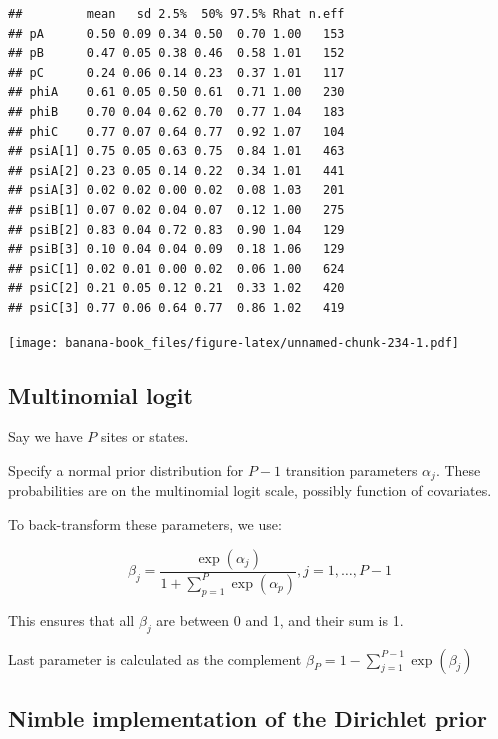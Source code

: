 \documentclass[
  12pt,
]{krantz}
\begin{document}
\begin{verbatim}
##         mean   sd 2.5%  50% 97.5% Rhat n.eff
## pA      0.50 0.09 0.34 0.50  0.70 1.00   153
## pB      0.47 0.05 0.38 0.46  0.58 1.01   152
## pC      0.24 0.06 0.14 0.23  0.37 1.01   117
## phiA    0.61 0.05 0.50 0.61  0.71 1.00   230
## phiB    0.70 0.04 0.62 0.70  0.77 1.04   183
## phiC    0.77 0.07 0.64 0.77  0.92 1.07   104
## psiA[1] 0.75 0.05 0.63 0.75  0.84 1.01   463
## psiA[2] 0.23 0.05 0.14 0.22  0.34 1.01   441
## psiA[3] 0.02 0.02 0.00 0.02  0.08 1.03   201
## psiB[1] 0.07 0.02 0.04 0.07  0.12 1.00   275
## psiB[2] 0.83 0.04 0.72 0.83  0.90 1.04   129
## psiB[3] 0.10 0.04 0.04 0.09  0.18 1.06   129
## psiC[1] 0.02 0.01 0.00 0.02  0.06 1.00   624
## psiC[2] 0.21 0.05 0.12 0.21  0.33 1.02   420
## psiC[3] 0.77 0.06 0.64 0.77  0.86 1.02   419
\end{verbatim}

\texttt{[image: banana-book\_files/figure-latex/unnamed-chunk-234-1.pdf]}

\hypertarget{multinomial-logit}{%
\subsection{Multinomial logit}\label{multinomial-logit}}

Say we have \(P\) sites or states.

Specify a normal prior distribution for \(P-1\) transition parameters \(\alpha_j\). These probabilities are on the multinomial logit scale, possibly function of covariates.

To back-transform these parameters, we use:

\[\beta_j = \displaystyle{\frac{\exp(\alpha_j)}{1+\displaystyle{\sum_{p=1}^P{\exp(\alpha_p)}}}}, j = 1,\ldots,P-1\]

This ensures that all \(\beta_j\) are between 0 and 1, and their sum is 1.

Last parameter is calculated as the complement \(\beta_P = 1 - \displaystyle{\sum_{j=1}^{P-1}{\exp(\beta_j)}}\)

\hypertarget{nimble-implementation-of-the-dirichlet-prior-2}{%
\subsection{Nimble implementation of the Dirichlet prior}\label{nimble-implementation-of-the-dirichlet-prior-2}}
\end{document}

